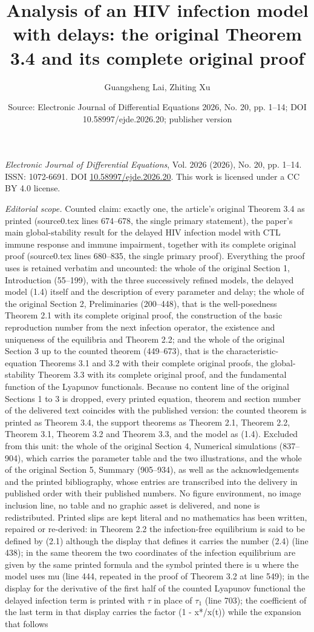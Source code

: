 \documentclass[10pt,a4paper]{amsart}
\title[Analysis of an HIV infection model with delays: original Theorem 3.4]{Analysis of an HIV infection model with delays: the original Theorem 3.4 and its complete original proof}
\author{Guangsheng Lai, Zhiting Xu}
\date{Source: Electronic Journal of Differential Equations 2026, No. 20, pp. 1--14; DOI 10.58997/ejde.2026.20; publisher version}
\numberwithin{equation}{section}
\begin{document}
\maketitle
\noindent\emph{Electronic Journal of Differential Equations}, Vol. 2026 (2026), No. 20, pp. 1--14.\newline
ISSN: 1072-6691. DOI \href{https://doi.org/10.58997/ejde.2026.20}{10.58997/ejde.2026.20}. This work is licensed under a CC BY 4.0 license.\par\smallskip
\noindent\textit{Editorial scope.} Counted claim: exactly one, the article's original Theorem 3.4 as printed (source0.tex lines 674--678, the single primary statement), the paper's main global-stability result for the delayed HIV infection model with CTL immune response and immune impairment, together with its complete original proof (source0.tex lines 680--835, the single primary proof). Everything the proof uses is retained verbatim and uncounted: the whole of the original Section 1, Introduction (55--199), with the three successively refined models, the delayed model (1.4) itself and the description of every parameter and delay; the whole of the original Section 2, Preliminaries (200--448), that is the well-posedness Theorem 2.1 with its complete original proof, the construction of the basic reproduction number from the next infection operator, the existence and uniqueness of the equilibria and Theorem 2.2; and the whole of the original Section 3 up to the counted theorem (449--673), that is the characteristic-equation Theorems 3.1 and 3.2 with their complete original proofs, the global-stability Theorem 3.3 with its complete original proof, and the fundamental function of the Lyapunov functionals. Because no content line of the original Sections 1 to 3 is dropped, every printed equation, theorem and section number of the delivered text coincides with the published version: the counted theorem is printed as Theorem 3.4, the support theorems as Theorem 2.1, Theorem 2.2, Theorem 3.1, Theorem 3.2 and Theorem 3.3, and the model as (1.4). Excluded from this unit: the whole of the original Section 4, Numerical simulations (837--904), which carries the parameter table and the two illustrations, and the whole of the original Section 5, Summary (905--934), as well as the acknowledgements and the printed bibliography, whose entries are transcribed into the delivery in published order with their published numbers. No figure environment, no image inclusion line, no table and no graphic asset is delivered, and none is redistributed. Printed slips are kept literal and no mathematics has been written, repaired or re-derived: in Theorem 2.2 the infection-free equilibrium is said to be defined by (2.1) although the display that defines it carries the number (2.4) (line 438); in the same theorem the two coordinates of the infection equilibrium are given by the same printed formula and the symbol printed there is u where the model uses mu (line 444, repeated in the proof of Theorem 3.2 at line 549); in the display for the derivative of the first half of the counted Lyapunov functional the delayed infection term is printed with $\tau$ in place of $\tau_1$ (line 703); the coefficient of the last term in that display carries the factor (1 - x*/x(t)) while the expansion that follows 
\end{document}
